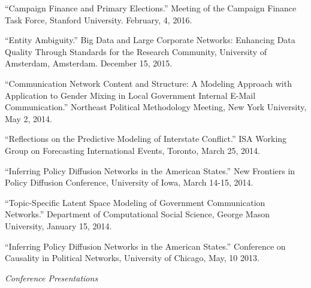\documentclass[overlapped,line]{res}
\begin{document}
\begin{resume}
\begin{etaremune}
\item ``Campaign Finance and Primary Elections.'' Meeting of the Campaign Finance Task Force, Stanford University. February, 4, 2016.
\item ``Entity Ambiguity.'' Big Data and Large Corporate Networks: Enhancing Data Quality Through Standards for the Research Community, University of Amsterdam, Amsterdam. December 15, 2015. 
\item ``Communication Network Content and Structure: A Modeling Approach with Application to Gender Mixing in Local Government Internal E-Mail Communication.'' Northeast Political Methodology Meeting, New York University, May 2, 2014.
\item ``Reflections on the Predictive Modeling of Interstate Conflict.'' ISA Working Group on Forecasting International Events, Toronto, March 25, 2014.
\item ``Inferring Policy Diffusion Networks in the American States.'' New Frontiers in Policy Diffusion Conference, University of  Iowa,  March 14-15, 2014.
\item  ``Topic-Specific Latent Space Modeling of Government Communication Networks.'' Department of Computational Social Science, George Mason University, January 15, 2014.
\item ``Inferring Policy Diffusion Networks in the American States.'' Conference on Causality in Political Networks, University of Chicago, May, 10 2013.
\end{etaremune}

\hspace{-1cm} \emph{Conference Presentations}
\begin{etaremune}


\end{etaremune}
\end{resume}
\end{document}
